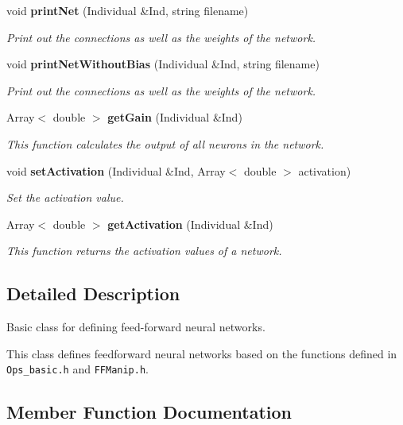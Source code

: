 \begin{CompactItemize}
void {\bf print\-Net} (Individual \&Ind, string filename)
\begin{CompactList}\small\item\em Print out the connections as well as the weights of the network.\item\end{CompactList}\item 
void {\bf print\-Net\-Without\-Bias} (Individual \&Ind, string filename)
\begin{CompactList}\small\item\em Print out the connections as well as the weights of the network.\item\end{CompactList}\item 
Array$<$ double $>$ {\bf get\-Gain} (Individual \&Ind)
\begin{CompactList}\small\item\em This function calculates the output of all neurons in the network.\item\end{CompactList}\item 
void {\bf set\-Activation} (Individual \&Ind, Array$<$ double $>$ activation)
\begin{CompactList}\small\item\em Set the activation value.\item\end{CompactList}\item 
Array$<$ double $>$ {\bf get\-Activation} (Individual \&Ind)
\begin{CompactList}\small\item\em This function returns the activation values of a network.\item\end{CompactList}\end{CompactItemize}


\subsection{Detailed Description}
Basic class for defining feed-forward neural networks.

This class defines feedforward neural networks based on the functions defined in {\tt Ops\_\-basic.h} and {\tt FFManip.h}. 



\subsection{Member Function Documentation}
